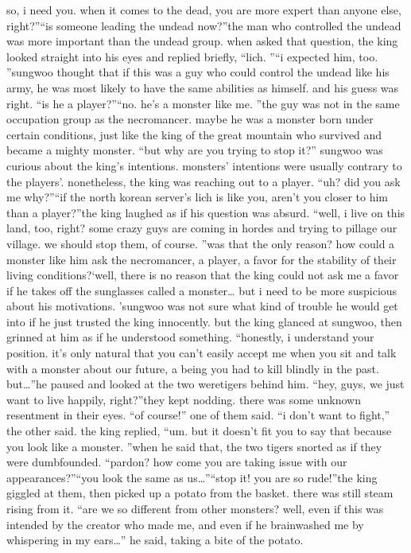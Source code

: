  so, i need you.
 when it comes to the dead, you are more expert than anyone else, right?”“is someone leading the undead now?”the man who controlled the undead was more important than the undead group.
when asked that question, the king looked straight into his eyes and replied briefly, “lich.
”“i expected him, too.
”sungwoo thought that if this was a guy who could control the undead like his army, he was most likely to have the same abilities as himself.
 and his guess was right.
“is he a player?”“no.
 he’s a monster like me.
”the guy was not in the same occupation group as the necromancer.
 maybe he was a monster born under certain conditions, just like the king of the great mountain who survived and became a mighty monster.
“but why are you trying to stop it?”
sungwoo was curious about the king’s intentions.
 monsters’ intentions were usually contrary to the players’.
 nonetheless, the king was reaching out to a player.
“uh? did you ask me why?”“if the north korean server’s lich is like you, aren’t you closer to him than a player?”the king laughed as if his question was absurd.
“well, i live on this land, too, right? some crazy guys are coming in hordes and trying to pillage our village.
 we should stop them, of course.
”was that the only reason? how could a monster like him ask the necromancer, a player, a favor for the stability of their living conditions?‘well, there is no reason that the king could not ask me a favor if he takes off the sunglasses called a monster… but i need to be more suspicious about his motivations.
’sungwoo was not sure what kind of trouble he would get into if he just trusted the king innocently.
but the king glanced at sungwoo, then grinned at him as if he understood something.
“honestly, i understand your position.
 it’s only natural that you can’t easily accept me when you sit and talk with a monster about our future, a being you had to kill blindly in the past.
 but…”he paused and looked at the two weretigers behind him.
“hey, guys, we just want to live happily, right?”they kept nodding.
 there was some unknown resentment in their eyes.
“of course!” one of them said.
“i don’t want to fight,” the other said.
the king replied, “um.
 but it doesn’t fit you to say that because you look like a monster.
”when he said that, the two tigers snorted as if they were dumbfounded.
“pardon? how come you are taking issue with our appearances?”“you look the same as us…”“stop it! you are so rude!”the king giggled at them, then picked up a potato from the basket.
 there was still steam rising from it.
“are we so different from other monsters? well, even if this was intended by the creator who made me, and even if he brainwashed me by whispering in my ears…” he said, taking a bite of the potato.
